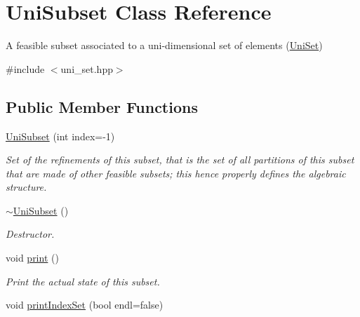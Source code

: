 \hypertarget{classUniSubset}{\section{Uni\-Subset Class Reference}
\label{classUniSubset}
}


A feasible subset associated to a uni-\/dimensional set of elements (\hyperlink{classUniSet}{Uni\-Set})  




{\ttfamily \#include $<$uni\-\_\-set.\-hpp$>$}

\subsection*{Public Member Functions}
\begin{DoxyCompactItemize}
\item 
\hyperlink{classUniSubset_a07ff3af1804ad82899583c0207b233dc}{Uni\-Subset} (int index=-\/1)
\begin{DoxyCompactList}\small\item\em Set of the refinements of this subset, that is the set of all partitions of this subset that are made of other feasible subsets; this hence properly defines the algebraic structure. \end{DoxyCompactList}\item 
\hypertarget{classUniSubset_a84519a983473e56ad479d29baff45a34}{\hyperlink{classUniSubset_a84519a983473e56ad479d29baff45a34}{$\sim$\-Uni\-Subset} ()}\label{classUniSubset_a84519a983473e56ad479d29baff45a34}

\begin{DoxyCompactList}\small\item\em Destructor. \end{DoxyCompactList}\item 
\hypertarget{classUniSubset_a1be7871c599958a13258e51b01832c25}{void \hyperlink{classUniSubset_a1be7871c599958a13258e51b01832c25}{print} ()}\label{classUniSubset_a1be7871c599958a13258e51b01832c25}

\begin{DoxyCompactList}\small\item\em Print the actual state of this subset. \end{DoxyCompactList}\item 
\hypertarget{classUniSubset_aea0db49838de9813249152cd3128a47e}{void \hyperlink{classUniSubset_aea0db49838de9813249152cd3128a47e}{print\-Index\-Set} (bool endl=false)}\label{classUniSubset_aea0db49838de9813249152cd3128a47e}


\end{DoxyCompactItemize}
